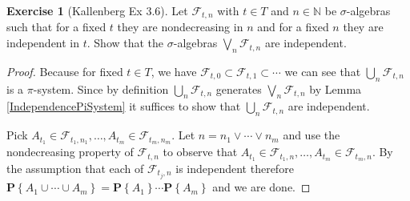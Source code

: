 \documentclass{amsbook}
\theoremstyle{definition}
\newtheorem{xca}{Exercise}
\theoremstyle{remark}
\newcommand{\probability}[1]{\textbf{P}\left \{#1 \right \}}
\newcommand{\naturals}{\mathbb{N}}
\newcommand{\orop}{\vee}
\begin{document}
\begin{xca}[Kallenberg Ex 3.6]Let $\mathcal{F}_{t,n}$ with $t \in T$ and $n \in \naturals$
  be $\sigma$-algebras such that for a fixed $t$ they are
  nondecreasing in $n$ and for a fixed $n$ they are independent in
  $t$.  Show that the $\sigma$-algebras $\bigvee_n \mathcal{F}_{t,n}$
  are independent.
\end{xca}
\begin{proof}
Because for fixed $t \in T$, we have $\mathcal{F}_{t,0} \subset
\mathcal{F}_{t,1} \subset \cdots$ we can see that $\bigcup_n
\mathcal{F}_{t,n}$ is a $\pi$-system.  Since by definition $\bigcup_n
\mathcal{F}_{t,n}$ generates $\bigvee_n
\mathcal{F}_{t,n}$ by Lemma \ref{IndependencePiSystem} it suffices to
show that $\bigcup_n \mathcal{F}_{t,n}$ are independent.

Pick $A_{t_1} \in \mathcal{F}_{t_1,n_1}, \dotsc, A_{t_m} \in
\mathcal{F}_{t_m,n_m}$. Let $n = n_1 \orop \dotsb \orop n_m$ and use
the nondecreasing property of $\mathcal{F}_{t,n}$ to observe that $A_{t_1} \in \mathcal{F}_{t_1,n}, \dotsc, A_{t_m} \in
\mathcal{F}_{t_m,n}$.  By the assumption that each of $\mathcal{F}_{t_j,n}$ is independent
therefore $\probability {A_1 \cup \dotsb \cup A_m} = \probability{A_1}
\dotsm \probability{A_m}$ and we are done.
\end{proof}
\end{document}

